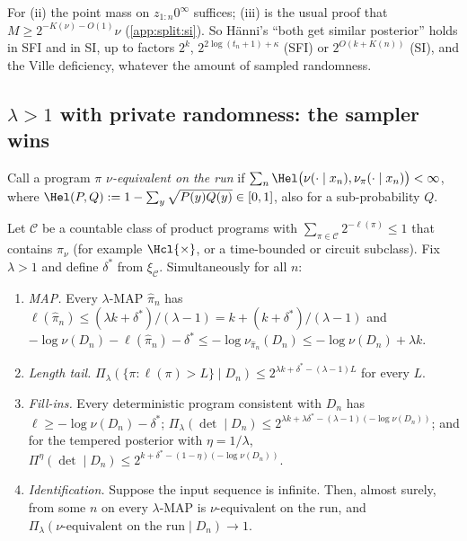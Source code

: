 For (ii) the point mass on $z_{1:n}0^\infty$ suffices; (iii) is the usual proof that $M\ge2^{-K(\nu)-O(1)}\nu$ \citep{li2008introduction} (\cref{app:split:si}). So H\"anni's ``both get similar posterior'' holds in SFI and in SI, up to factors $2^k$, $2^{2\log(t_n+1)+\kappa}$ (SFI) or $2^{O(k+K(n))}$ (SI), and the Ville deficiency, whatever the amount of sampled randomness.

\subsection{$\lambda>1$ with private randomness: the sampler wins}\label{sec:split:private}

Call a program $\pi$ \emph{$\nu$-equivalent on the run} if $\sum_n\Hel\big(\nu(\cdot\mid x_n),\nu_\pi(\cdot\mid x_n)\big)<\infty$, where $\Hel(P,Q):=1-\sum_y\sqrt{P(y)Q(y)}\in[0,1]$, also for a sub-probability $Q$.

\begin{theorem}\label{thm:split:private}
Let $\mathcal C$ be a countable class of product programs with $\sum_{\pi\in\mathcal C}2^{-\ell(\pi)}\le1$ that contains $\pi_\nu$ (for example $\Hcl{\times}$, or a time-bounded or circuit subclass). Fix $\lambda>1$ and define $\delta^*$ from $\xi_{\mathcal C}$. Simultaneously for all $n$:
\begin{enumerate}[label=(\roman*)]
\item \emph{MAP.} Every $\lambda$-MAP $\hat\pi_n$ has $\ell(\hat\pi_n)\le(\lambda k+\delta^*)/(\lambda-1)=k+(k+\delta^*)/(\lambda-1)$ and $-\log\nu(D_n)-\ell(\hat\pi_n)-\delta^*\le-\log\nu_{\hat\pi_n}(D_n)\le-\log\nu(D_n)+\lambda k$.
\item \emph{Length tail.} $\Pi_\lambda(\{\pi:\ell(\pi)>L\}\mid D_n)\le2^{\lambda k+\delta^*-(\lambda-1)L}$ for every $L$.
\item \emph{Fill-ins.} Every deterministic program consistent with $D_n$ has $\ell\ge-\log\nu(D_n)-\delta^*$; $\Pi_\lambda(\det\mid D_n)\le2^{\lambda k+\lambda\delta^*-(\lambda-1)(-\log\nu(D_n))}$; and for the tempered posterior with $\eta=1/\lambda$, $\Pi^\eta(\det\mid D_n)\le2^{k+\delta^*-(1-\eta)(-\log\nu(D_n))}$.
\item \emph{Identification.} Suppose the input sequence is infinite. Then, almost surely, from some $n$ on every $\lambda$-MAP is $\nu$-equivalent on the run, and $\Pi_\lambda(\nu\text{-equivalent on the run}\mid D_n)\to1$.
\end{enumerate}
\end{theorem}

